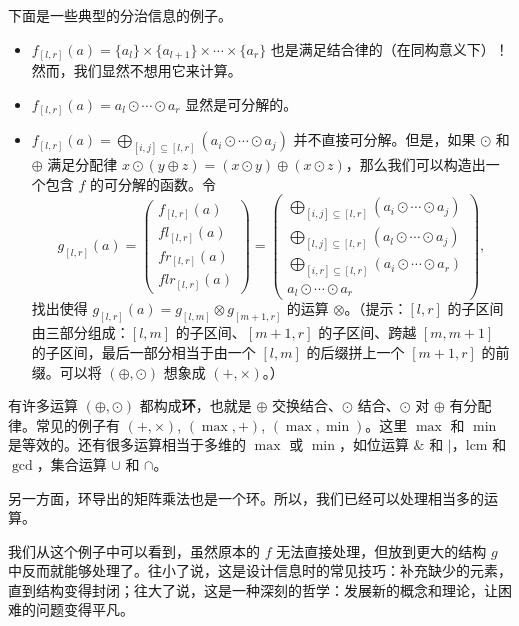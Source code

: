 下面是一些典型的分治信息的例子。
\begin{example}
    \begin{itemize}
        \item $f_{[l,r]}(a)=\{a_l\}\times \{a_{l+1}\}\times \cdots\times \{a_r\}$ 也是满足结合律的（在同构意义下）！然而，我们显然不想用它来计算。
        \item $f_{[l,r]}(a)=a_l\odot\cdots\odot a_r$ 显然是可分解的。
        \item $f_{[l,r]}(a)=\bigoplus_{[i,j]\subseteq [l,r]}\left(a_i\odot \cdots\odot a_{j}\right)$ 并不直接可分解。但是，如果 $\odot$ 和 $\oplus$ 满足分配律 $x\odot (y\oplus z)=(x\odot y)\oplus (x\odot z)$，那么我们可以构造出一个包含 $f$ 的可分解的函数。令 
        $$
        g_{[l,r]}(a)=\left(\begin{matrix}
            f_{[l,r]}(a)\\
            fl_{[l,r]}(a)\\
            fr_{[l,r]}(a)\\
            flr_{[l,r]}(a)
        \end{matrix}\right)=\left(\begin{matrix}
            \bigoplus_{[i,j]\subseteq [l,r]}\left(a_i\odot \cdots\odot a_{j}\right)\\
            \bigoplus_{[l,j]\subseteq [l,r]}\left(a_l\odot \cdots\odot a_{j}\right)\\
            \bigoplus_{[i,r]\subseteq [l,r]}\left(a_i\odot \cdots\odot a_{r}\right)\\
            a_l\odot\cdots\odot a_r
        \end{matrix}\right),
        $$
        找出使得 $g_{[l,r]}(a)=g_{[l,m]}\otimes g_{[m+1,r]}$ 的运算 $\otimes$。（提示：$[l,r]$ 的子区间由三部分组成：$[l,m]$ 的子区间、$[m+1,r]$ 的子区间、跨越 $[m,m+1]$ 的子区间，最后一部分相当于由一个 $[l,m]$ 的后缀拼上一个 $[m+1,r]$ 的前缀。可以将 $(\oplus,\odot)$ 想象成 $(+,\times)$。）
    \end{itemize}
\end{example}
\begin{remark}
    有许多运算 $(\oplus,\odot)$ 都构成\textbf{环}，也就是 $\oplus$ 交换结合、$\odot$ 结合、$\odot$ 对 $\oplus$ 有分配律。常见的例子有 $(+,\times)$, $(\max,+)$, $(\max,\min)$。这里 $\max$ 和 $\min$ 是等效的。还有很多运算相当于多维的 $\max$ 或 $\min$，如位运算 $\&$ 和 $|$，$\mathrm{lcm}$ 和 $\gcd$，集合运算 $\cup$ 和 $\cap$。
        
    另一方面，环导出的矩阵乘法也是一个环。所以，我们已经可以处理相当多的运算。
\end{remark}
\begin{remark}
    我们从这个例子中可以看到，虽然原本的 $f$ 无法直接处理，但放到更大的结构 $g$ 中反而就能够处理了。往小了说，这是设计信息时的常见技巧：补充缺少的元素，直到结构变得封闭；往大了说，这是一种深刻的哲学：发展新的概念和理论，让困难的问题变得平凡。
\end{remark}

